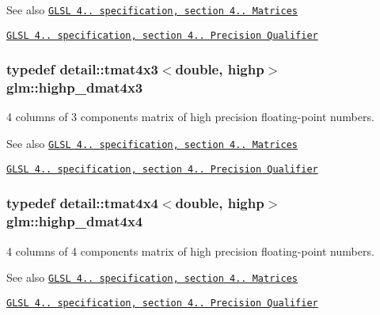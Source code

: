 \begin{DoxySeeAlso}{See also}
\href{http://www.opengl.org/registry/doc/GLSLangSpec.4.20.8.pdf}{\tt G\+L\+SL 4.. specification, section 4.. Matrices} 

\href{http://www.opengl.org/registry/doc/GLSLangSpec.4.20.8.pdf}{\tt G\+L\+SL 4.. specification, section 4.. Precision Qualifier} 
\end{DoxySeeAlso}
\subsubsection[{\texorpdfstring{highp\+\_\+dmat4x3}{highp_dmat4x3}}]{\setlength{\rightskip}{0pt plus 5cm}typedef detail\+::tmat4x3$<$double, highp$>$ {\bf glm\+::highp\+\_\+dmat4x3}}\hypertarget{group__core__precision_gaf8aeba0eecc5c651e0f06414b6e37754}{}\label{group__core__precision_gaf8aeba0eecc5c651e0f06414b6e37754}
4 columns of 3 components matrix of high precision floating-\/point numbers.

\begin{DoxySeeAlso}{See also}
\href{http://www.opengl.org/registry/doc/GLSLangSpec.4.20.8.pdf}{\tt G\+L\+SL 4.. specification, section 4.. Matrices} 

\href{http://www.opengl.org/registry/doc/GLSLangSpec.4.20.8.pdf}{\tt G\+L\+SL 4.. specification, section 4.. Precision Qualifier} 
\end{DoxySeeAlso}
\subsubsection[{\texorpdfstring{highp\+\_\+dmat4x4}{highp_dmat4x4}}]{\setlength{\rightskip}{0pt plus 5cm}typedef detail\+::tmat4x4$<$double, highp$>$ {\bf glm\+::highp\+\_\+dmat4x4}}\hypertarget{group__core__precision_ga1c0a2edbde597b59e9005691a224b208}{}\label{group__core__precision_ga1c0a2edbde597b59e9005691a224b208}
4 columns of 4 components matrix of high precision floating-\/point numbers.

\begin{DoxySeeAlso}{See also}
\href{http://www.opengl.org/registry/doc/GLSLangSpec.4.20.8.pdf}{\tt G\+L\+SL 4.. specification, section 4.. Matrices} 

\href{http://www.opengl.org/registry/doc/GLSLangSpec.4.20.8.pdf}{\tt G\+L\+SL 4.. specification, section 4.. Precision Qualifier} 
\end{DoxySeeAlso}
